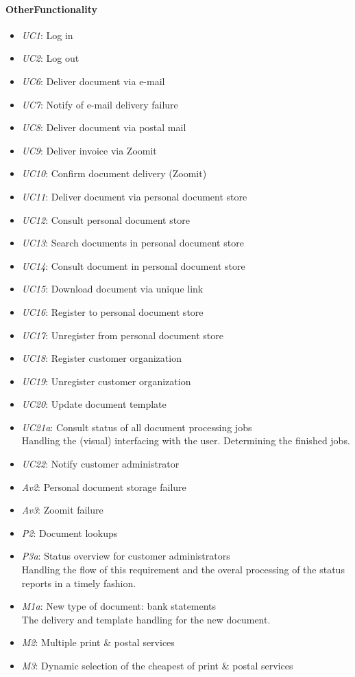 \documentclass[a4paper,10pt]{article}
\begin{document}
\paragraph{OtherFunctionality}
\begin{itemize}
    \item \emph{UC1}: Log in
    \item \emph{UC2}: Log out
    \item \emph{UC6}: Deliver document via e-mail
    \item \emph{UC7}: Notify of e-mail delivery failure
    \item \emph{UC8}: Deliver document via postal mail
    \item \emph{UC9}: Deliver invoice via Zoomit
    \item \emph{UC10}: Confirm document delivery (Zoomit)
    \item \emph{UC11}: Deliver document via personal document store
    \item \emph{UC12}: Consult personal document store
    \item \emph{UC13}: Search documents in personal document store
    \item \emph{UC14}: Consult document in personal document store
    \item \emph{UC15}: Download document via unique link
    \item \emph{UC16}: Register to personal document store
    \item \emph{UC17}: Unregister from personal document store
    \item \emph{UC18}: Register customer organization
    \item \emph{UC19}: Unregister customer organization
    \item \emph{UC20}: Update document template
    \item \emph{UC21a}: Consult status of all document processing jobs\\
    Handling the (visual) interfacing with the user. Determining the finished jobs.
    \item \emph{UC22}: Notify customer administrator
    \item \emph{Av2}: Personal document storage failure 
    \item \emph{Av3}: Zoomit failure
    \item \emph{P2}: Document lookups
    \item \emph{P3a}: Status overview for customer administrators\\
    Handling the flow of this requirement and the overal processing of the status reports in a timely fashion.
    \item \emph{M1a}: New type of document: bank statements\\
    The delivery and template handling for the new document.
    \item \emph{M2}: Multiple print \& postal services
    \item \emph{M3}: Dynamic selection of the cheapest of print \& postal services
\end{itemize}
\end{document}

